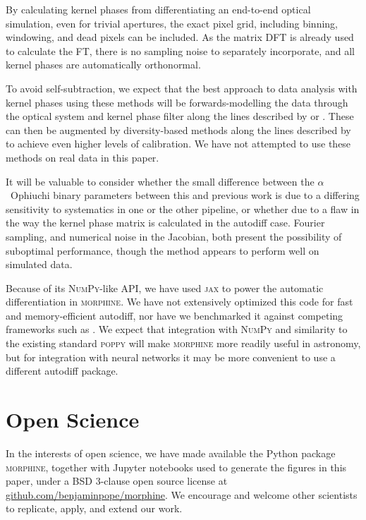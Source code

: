 \documentclass[modern]{aastex63}
\begin{document}
By calculating kernel phases from differentiating an end-to-end optical simulation, even for trivial apertures, the exact pixel grid, including binning, windowing, and dead pixels can be included. As the matrix DFT is already used to calculate the FT, there is no sampling noise to separately incorporate, and all kernel phases are automatically orthonormal.

To avoid self-subtraction, we expect that the best approach to data analysis with kernel phases using these methods will be forwards-modelling the data through the optical system and kernel phase filter along the lines described by \citet{pueyo16} or \citet{martinache20}. These can then be augmented by diversity-based methods along the lines described by \citet{ireland13} to achieve even higher levels of calibration. We have not attempted to use these methods on real data in this paper.

It will be valuable to consider whether the small difference between the $\alpha$~Ophiuchi binary parameters between this and previous work is due to a differing sensitivity to systematics in one or the other pipeline, or whether due to a flaw in the way the kernel phase matrix is calculated in the autodiff case. Fourier sampling, and numerical noise in the Jacobian, both present the possibility of suboptimal performance, though the method appears to perform well on simulated data.

Because of its \textsc{NumPy}-like API, we have used \textsc{jax} to power the automatic differentiation in \textsc{morphine}. We have not extensively optimized this code for fast and memory-efficient autodiff, nor have we benchmarked it against competing frameworks such as . We expect that integration with \textsc{NumPy} and similarity to the existing standard \textsc{poppy} will make \textsc{morphine} more readily useful in astronomy, but for integration with neural networks it may be more convenient to use a different autodiff package. 

\section{Open Science}
\label{sec:open}

In the interests of open science, we have made available the Python package \textsc{morphine}, together with Jupyter notebooks used to generate the figures in this paper, under a BSD 3-clause open source license at \href{https://github.com/benjaminpope/morphine}{github.com/benjaminpope/morphine}. We encourage and welcome other scientists to replicate, apply, and extend our work.
\end{document}
